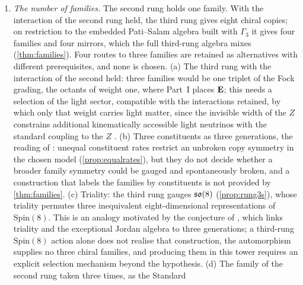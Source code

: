 \begin{enumerate}[leftmargin=2em,itemsep=4pt]
it subject to a sum rule within the restricted ansatz (\cref{thm:split}); the sum rule is not protected (\cref{thm:potential}); and the general
split has four free values per family (\cref{thm:splitgen}). The observed hierarchy of the top quark over the bottom quark and the tau
motivates a near-pure-up interpretation of the heaviest family within the restricted ansatz. The neutrino Dirac entry is undetermined: with
an independent $d$ the same charged masses admit different neutrino Dirac entries, and the data do not locate the vacuum in the full neutral
space. Open are what sets $\kappa$, $x_3$, $x_B$ and $d$, and the size of $d$, which depends on the couplings and on the curvature of the
potential.
\item \emph{The number of families.} The second rung holds one family. With the interaction of the second rung held, the third rung gives
eight chiral copies; on restriction to the embedded Pati--Salam algebra built with $\Gamma_3$ it gives four families and four mirrors, which
the full third-rung algebra mixes (\cref{thm:families}). Four routes to three families are retained as alternatives with different
prerequisites, and none is chosen. (a) The third rung with the interaction of the second held: three families would be one triplet of the
Fock grading, the octants of weight one, where Part~I places $\mathbf E$; this needs a selection of the light sector, compatible with the
interactions retained, by which only that weight carries light matter, since the invisible width of the $Z$ constrains additional
kinematically accessible light neutrinos with the standard coupling to the $Z$ \cite{PDGnu}. (b) Three constituents as three generations, the
reading of : unequal constituent rates restrict an unbroken copy symmetry in the chosen model (\cref{prop:equalrates}), but
they do not decide whether a broader family symmetry could be gauged and spontaneously broken, and a construction that labels the families by
constituents is not provided by \cref{thm:families}. (c) Triality: the third rung gauges $\mathfrak{so}(8)$ (\cref{prop:rung3s}), whose triality permutes
three inequivalent eight-dimensional representations of $\mathrm{Spin}(8)$. This is an analogy motivated by the conjecture of
\cite{Boyle2020}, which links triality and the exceptional Jordan algebra to three generations; a third-rung $\mathrm{Spin}(8)$ action alone
does not realise that construction, the automorphism supplies no three chiral families, and producing them in this tower requires an
explicit selection mechanism beyond the hypothesis. (d) The family of the second rung taken three times, as the Standard

\end{enumerate}
